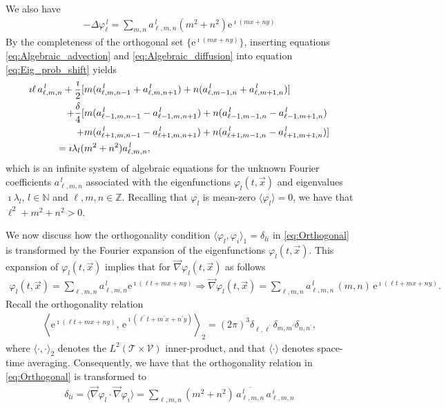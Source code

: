 \documentclass[11pt]{amsart}
\newcommand{\e}{\mathrm{e}}
\newcommand{\Tc}{\mathcal{T}}
\newcommand{\Vc}{\mathcal{V}}
\begin{document}
%
We also have 
%
\begin{align}\label{eq:Algebraic_diffusion}
  -\Delta\varphi_\ell^{\,l}=\sum_{m,n}a^{\,l}_{\ell,m,n}(m^2+n^2)\e^{\imath (mx+ny)}
\end{align}
%
By the completeness of the orthogonal set $\{\e^{\imath (mx+ny)}\}$, 
inserting equations \eqref{eq:Algebraic_advection} and
\eqref{eq:Algebraic_diffusion} into equation
\eqref{eq:Eig_prob_shift} yields
%
\begin{align}\label{eq:Fourier_Coef_System}
\imath \ell\,a^{\,l}_{\ell,m,n}+\frac{\imath}{2}
[&m(a^{\,l}_{\ell,m,n-1}+a^{\,l}_{\ell,m,n+1})+n(a^{\,l}_{\ell,m-1,n}+a^{\,l}_{\ell,m+1,n})]
\notag\\
+\frac{\delta}{4}[&m(a^{\,l}_{\ell-1,m,n-1}-a^{\,l}_{\ell-1,m,n+1})+n(a^{\,l}_{\ell-1,m-1,n}-a^{\,l}_{\ell-1,m+1,n})
\notag\\
+&m(a^{\,l}_{\ell+1,m,n-1}-a^{\,l}_{\ell+1,m,n+1})+n(a^{\,l}_{\ell+1,m-1,n}-a^{\,l}_{\ell+1,m+1,n})]
\notag\\
=\imath\lambda_l(&m^2+n^2)a^{\,l}_{\ell,m,n},
\end{align}
%
which is an infinite system of algebraic equations for the unknown
Fourier coefficients $a^{\,l}_{\ell,m,n}$ associated with the
eigenfunctions $\varphi_l(t,\vec{x})$ and eigenvalues $\imath\lambda_l$,
$l\in\mathbb{N}$ and $\ell,m,n\in\mathbb{Z}$. Recalling that $\varphi_l$ is
mean-zero $\langle\varphi_l\rangle=0$, we have that $\ell^2+m^2+n^2>0$.




We now discuss how the orthogonality condition
$\langle\varphi_l,\varphi_i\rangle_1=\delta_{li}$ in \eqref{eq:Orthogonal} is
transformed by the Fourier expansion of the
eigenfunctions $\varphi_l(t,\vec{x})$. This expansion of $\varphi_l(t,\vec{x})$ 
implies that for $\vec{\nabla}\varphi_l(t,\vec{x})$ as follows 
%
\begin{align}\label{eq:Eigenfunction_Grad_expansion}
  \varphi_l(t,\vec{x})=\sum_{\ell,m,n}a^{\,l}_{\ell,m,n}\e^{\imath (\ell t+mx+ny)}\Rightarrow
  \vec{\nabla}\varphi_l(t,\vec{x})=\sum_{\ell,m,n}a^{\,l}_{\ell,m,n}\,(m,n)\,\e^{\imath (\ell t+mx+ny)}.
\end{align}
%
Recall the orthogonality relation 
%
\begin{align}\label{eq:Trig_orthogonal}  
      \left\langle
      \e^{\imath (\ell t+mx+ny)},\,\e^{\imath (\ell^\prime t+m^\prime x+n^\prime y)}
      \right\rangle_2
      =
      (2\pi)^3\delta_{\ell,\ell^\prime}\delta_{m,m^\prime}\delta_{n,n^\prime},
\end{align}
%
where $\langle\cdot,\cdot\rangle_2$ denotes the $L^2(\Tc\times\Vc)$ inner-product, and that
$\langle\cdot\rangle$ denotes space-time averaging. Consequently, we have that the
orthogonality relation in \eqref{eq:Orthogonal} is transformed to   
%
\begin{align}\label{eq:Ortho_Clmn}
  \delta_{li}=\langle\vec{\nabla}\varphi_l\cdot\vec{\nabla}\varphi_i\rangle
      = \sum_{\ell,m,n}(m^2+n^2)\,\overline{a^{\,l}_{\ell,m,n}}\,a^{\,i}_{\ell,m,n}
\end{align}
%
\end{document}
